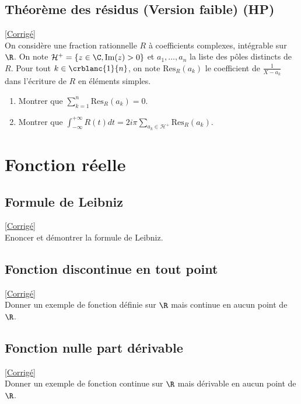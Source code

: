 \documentclass{book}
\begin{document}
	\section{Théorème des résidus (Version faible) (HP)}
	\textcolor{blue}{\hyperref[sec:theoreme-des-residus-version-faible]{[Corrigé]}}\\
	\label{residus}
	\label{Théorème des résidus (Version faible)}
	On considère une fraction rationnelle $R$ à coefficients complexes, intégrable sur $\R$. On note $\mathcal H^+=\{z\in\C, \text{Im}(z)>0\}$ et $a_1 , \dots ,a_n$ la liste des pôles distincts de $R$. Pour tout $k\in\crblanc{1}{n}$, on note $\text{Res}_R(a_k)$ le coefficient de $\displaystyle\frac{1}{X-a_k}$ dans l'écriture de $R$ en éléments simples.
	\begin{enumerate}
		\item Montrer que $\displaystyle\sum_{k=1}^n\text{Res}_R(a_k)=0$.
		\item Montrer que $\displaystyle \int_{-\infty}^{+\infty}R(t)dt=2i\pi\sum_{a_k\in\mathcal{H}^+}\text{Res}_R(a_k)$.
	\end{enumerate}
	
	
\chapter{Fonction réelle}
	\section{Formule de Leibniz }
	\textcolor{blue}{\hyperref[sec:formule-de-leibniz-etoile1]{[Corrigé]}}\\
	\label{leibniz}
	\label{Formule de Leibniz}
	Enoncer et démontrer la formule de Leibniz.
	
	\section{Fonction discontinue en tout point }
	\textcolor{blue}{\hyperref[sec:fonction-discontinue-en-tout-point-etoile1]{[Corrigé]}}\\
	\label{discontinuetoutpoint}
	\label{Fonction discontinue en tout point}
	Donner un exemple de fonction définie sur $\R$ mais continue en aucun point de $\R$.
	
	\section{Fonction nulle part dérivable }
	\textcolor{blue}{\hyperref[sec:fonction-nulle-part-derivable]{[Corrigé]}}\\
	\label{nullepartdérivable}
	\label{FOnction nulle part dérivable}
	Donner un exemple de fonction continue sur $\R$ mais dérivable en aucun point de $\R$.
	
\end{document}
